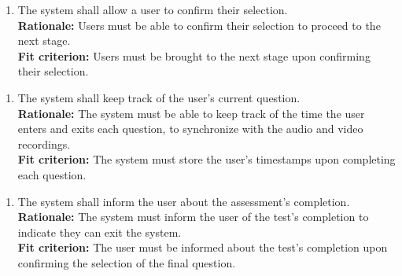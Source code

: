 \documentclass[12pt]{article}
\begin{document}
\begin{enumerate}[{FR-AI}5. ]
  \item The system shall allow a user to confirm their selection.\\
  \textbf{Rationale: }Users must be able to confirm their selection to proceed to the next stage.\\
  \textbf{Fit criterion: }Users must be brought to the next stage upon confirming their selection.
\end{enumerate}
\begin{enumerate}[{FR-AI}6. ]
  \item The system shall keep track of the user's current question.\\
  \textbf{Rationale: }The system must be able to keep track of the time the user enters and exits each question, to synchronize with the audio and video recordings.\\
  \textbf{Fit criterion: }The system must store the user's timestamps upon completing each question.
\end{enumerate}
\begin{enumerate}[{FR-AI}7. ]
  \item The system shall inform the user about the assessment's completion.\\
  \textbf{Rationale: }The system must inform the user of the test's completion to indicate they can exit the system.\\
  \textbf{Fit criterion: }The user must be informed about the test's completion upon confirming the selection of the final question.
\end{enumerate}
\end{document}
